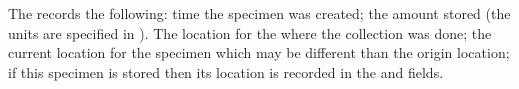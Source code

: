 The  records the following: time the specimen was created;
the amount stored (the units are specified in ). The
location for the  where the collection was done; the current
location for the specimen which may be different than the origin location; if
this specimen is stored then its location is recorded in the
 and  fields.


